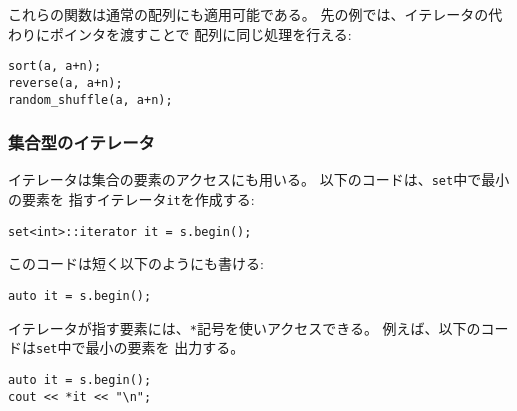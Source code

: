 これらの関数は通常の配列にも適用可能である。
先の例では、イテレータの代わりにポインタを渡すことで
配列に同じ処理を行える:

\newpage
\begin{lstlisting}
sort(a, a+n);
reverse(a, a+n);
random_shuffle(a, a+n);
\end{lstlisting}

\begin{comment}
\subsubsection{Set iterators}

Iterators are often used to access
elements of a set.
The following code creates an iterator
\texttt{it} that points to the smallest element in a set:
\begin{lstlisting}
set<int>::iterator it = s.begin();
\end{lstlisting}
A shorter way to write the code is as follows:
\begin{lstlisting}
auto it = s.begin();
\end{lstlisting}
The element to which an iterator points
can be accessed using the \texttt{*} symbol.
For example, the following code prints
the first element in the set:
\end{comment}

\subsubsection{集合型のイテレータ}

イテレータは集合の要素のアクセスにも用いる。
以下のコードは、\texttt{set}中で最小の要素を
指すイテレータ\texttt{it}を作成する:
\begin{lstlisting}
set<int>::iterator it = s.begin();
\end{lstlisting}
このコードは短く以下のようにも書ける:
\begin{lstlisting}
auto it = s.begin();
\end{lstlisting}

イテレータが指す要素には、\texttt{*}記号を使いアクセスできる。
例えば、以下のコードは\texttt{set}中で最小の要素を
出力する。

\begin{lstlisting}
auto it = s.begin();
cout << *it << "\n";
\end{lstlisting}

\begin{comment}
Iterators can be moved using the operators
\texttt{++} (forward) and \texttt{--} (backward),
meaning that the iterator moves to the next
or previous element in the set.

The following code prints all the elements
in increasing order:
\end{comment}

